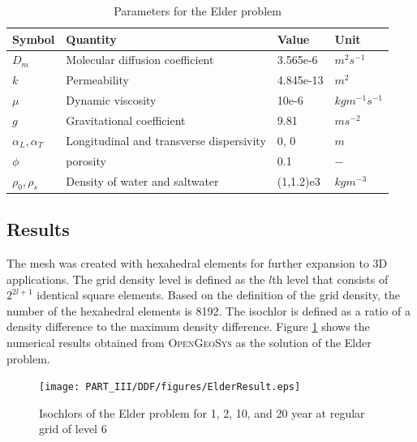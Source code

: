 \begin{table}[H]
\begin{center}
\begin{tabular}{llll}
\hline \hline
Symbol & Quantity   &  Value  & Unit\\
\hline \hline
 $D _m$ & Molecular diffusion coefficient & 3.565e-6  &  $m^2 s^{ - 1}$ \\
 $k$ & Permeability & 4.845e-13  &  $m^2$ \\
 $\mu$ & Dynamic viscosity & 10e-6  &  $kg m^{ - 1} s^{ - 1}$ \\
 $g$ & Gravitational coefficient & 9.81  &  $m s^{ - 2}$ \\
 $\alpha _L , \alpha _T$ & Longitudinal and transverse dispersivity & 0, 0  &  $m$ \\
 $\phi$ & porosity & 0.1  &  $-$ \\
 $\rho _0 , \rho _s$ & Density of water and saltwater & (1,1.2)e3  &  $kg m^{ - 3}$ \\
\hline \hline
\end{tabular}
\end{center}
\caption{Parameters for the Elder problem} \label{TableElder}
\end{table}


\subsection{Results}

The mesh was created with hexahedral elements for further expansion to 3D applications. The grid density level is defined as the $l$th level that consists of $2^{2l+1}$ identical square elements. Based on the definition of the grid density, the number of the hexahedral elements is 8192. The isochlor is defined as a ratio of a density difference to the maximum density difference. Figure \ref{ElderResult} shows the numerical results obtained from \textsc{OpenGeoSys} as the solution of the Elder problem.

\begin{figure}[h]
\centering
\texttt{[image: PART\_III/DDF/figures/ElderResult.eps]}
\caption{Isochlors of the Elder problem for 1, 2, 10, and 20 year at
regular grid of level 6} \label{ElderResult}
\end{figure}